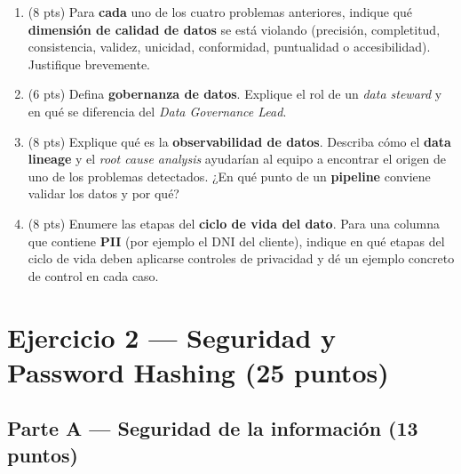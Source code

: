 \documentclass[11pt,a4paper]{article}
\begin{document}
\begin{enumerate}
  \item (8 pts) Para \textbf{cada} uno de los cuatro problemas anteriores, indique qué \textbf{dimensión de calidad de datos} se está violando (precisión, completitud, consistencia, validez, unicidad, conformidad, puntualidad o accesibilidad). Justifique brevemente.

  \vspace{4cm}

  \item (6 pts) Defina \textbf{gobernanza de datos}. Explique el rol de un \textit{data steward} y en qué se diferencia del \textit{Data Governance Lead}.

  \vspace{3.5cm}

  \item (8 pts) Explique qué es la \textbf{observabilidad de datos}. Describa cómo el \textbf{data lineage} y el \textit{root cause analysis} ayudarían al equipo a encontrar el origen de uno de los problemas detectados. ¿En qué punto de un \textbf{pipeline} conviene validar los datos y por qué?

  \vspace{4.5cm}

  \item (8 pts) Enumere las etapas del \textbf{ciclo de vida del dato}. Para una columna que contiene \textbf{PII} (por ejemplo el DNI del cliente), indique en qué etapas del ciclo de vida deben aplicarse controles de privacidad y dé un ejemplo concreto de control en cada caso.

  \vspace{4.5cm}
\end{enumerate}

\newpage

\section*{Ejercicio 2 — Seguridad y Password Hashing \hfill\normalfont(25 puntos)}

\subsection*{Parte A — Seguridad de la información (13 puntos)}
\end{document}
